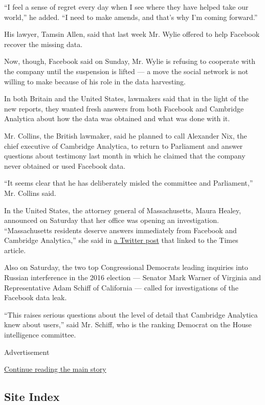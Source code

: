 ``I feel a sense of regret every day when I see where they have helped
take our world,'' he added. ``I need to make amends, and that's why I'm
coming forward.''

His lawyer, Tamsin Allen, said that last week Mr. Wylie offered to help
Facebook recover the missing data.

Now, though, Facebook said on Sunday, Mr. Wylie is refusing to cooperate
with the company until the suspension is lifted --- a move the social
network is not willing to make because of his role in the data
harvesting.

In both Britain and the United States, lawmakers said that in the light
of the new reports, they wanted fresh answers from both Facebook and
Cambridge Analytica about how the data was obtained and what was done
with it.

Mr. Collins, the British lawmaker, said he planned to call Alexander
Nix, the chief executive of Cambridge Analytica, to return to Parliament
and answer questions about testimony last month in which he claimed that
the company never obtained or used Facebook data.

``It seems clear that he has deliberately misled the committee and
Parliament,'' Mr. Collins said.

In the United States, the attorney general of Massachusetts, Maura
Healey, announced on Saturday that her office was opening an
investigation. ``Massachusetts residents deserve answers immediately
from Facebook and Cambridge Analytica,'' she said in
\href{https://twitter.com/MassAGO/status/975052674818347013}{a Twitter
post} that linked to the Times article.

Also on Saturday, the two top Congressional Democrats leading inquiries
into Russian interference in the 2016 election --- Senator Mark Warner
of Virginia and Representative Adam Schiff of California --- called for
investigations of the Facebook data leak.

``This raises serious questions about the level of detail that Cambridge
Analytica knew about users,'' said Mr. Schiff, who is the ranking
Democrat on the House intelligence committee.

Advertisement

\protect\hyperlink{after-bottom}{Continue reading the main story}

\hypertarget{site-index}{%
\subsection{Site Index}\label{site-index}}


